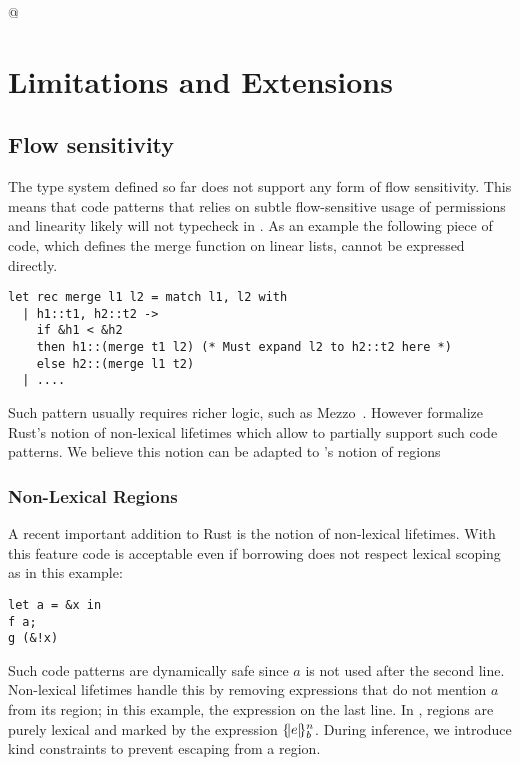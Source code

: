 \lstMakeShortInline[keepspaces,basicstyle=\small\ttfamily]@
\section{Limitations and Extensions}

\subsection{Flow sensitivity}

The type system defined so far does not support any
form of flow sensitivity. This means that code patterns that relies on
subtle flow-sensitive usage of permissions and linearity likely will not
typecheck in \lang. As an example the following piece of code,
which defines the merge function on linear lists,
cannot be expressed directly.

\begin{lstlisting}
let rec merge l1 l2 = match l1, l2 with
  | h1::t1, h2::t2 ->
    if &h1 < &h2 
    then h1::(merge t1 l2) (* Must expand l2 to h2::t2 here *)
    else h2::(merge l1 t2)
  | ....
\end{lstlisting}

Such pattern usually requires richer logic, such as
Mezzo~\citep{DBLP:phd/hal/Protzenko14}.
However
\citet{DBLP:journals/corr/abs-1903-00982} formalize Rust's
notion of non-lexical lifetimes which allow to partially support such
code patterns. We believe this notion can be adapted to \lang's notion of
regions

\subsubsection{Non-Lexical Regions}

A recent important addition to Rust is the notion of non-lexical lifetimes.
With this feature code is acceptable even if borrowing does not respect
lexical scoping as in this example:

\begin{lstlisting}
let a = &x in
f a;
g (&!x)
\end{lstlisting}

Such code patterns are dynamically safe since $a$ is not used after
the second line.
Non-lexical lifetimes handle this by removing expressions
that do not mention $a$ from its region; in this example,  the
expression on the last line.
%
In \lang, regions are purely lexical and marked by the
expression $\region{b}{e}$.
During inference, we introduce kind constraints to prevent escaping from
a region.

